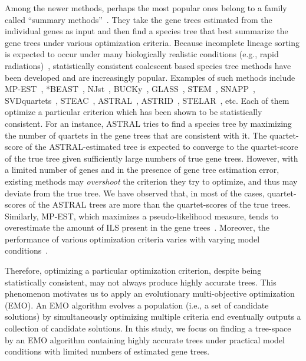 Among the newer methods, perhaps the most popular ones belong to a family called ``summary methods''~\cite{bayzid2013naive}. They take the gene trees estimated from the individual genes as input and then find a species tree that best summarize the gene trees under various optimization criteria. 
Because incomplete lineage sorting is
expected to occur under many biologically realistic conditions (e.g., rapid radiations)~\cite{jarvis2014whole}, statistically consistent coalescent based species tree methods have been developed and are increasingly popular. 
Examples of such methods include
MP-EST~\cite{mpest}, *BEAST~\cite{heled-drummond}, NJst~\cite{njst}, BUCKy~\cite{larget-bioinf2010}, GLASS~\cite{glass}, STEM~\cite{stem}, SNAPP~\cite{snapp}, SVDquartets~\cite{svdquartet}, STEAC~\cite{steac},
ASTRAL~\cite{mirarab2014astral}, ASTRID~\cite{vachaspati2015astrid}, STELAR~\cite{islam2019stelar}, etc. Each of them optimize a particular criterion which has been shown to be statistically consistent. For an instance, ASTRAL tries to find a species tree by maximizing the number of quartets in the gene trees that are consistent with it. The quartet-score of the ASTRAL-estimated tree is expected to converge to the quartet-score of the true tree given sufficiently large numbers of true gene trees. However, with a limited number of genes and in the presence of gene tree estimation error, existing methods may \textit{overshoot} the criterion they try to optimize, and thus may deviate from the true tree. We have observed that, in most of the cases, quartet-scores of the ASTRAL trees are more than the quartet-scores of the true trees. Similarly, MP-EST, which maximizes a pseudo-likelihood measure, tends to overestimate the amount of ILS present in the gene trees~\cite{statistical-binning,bayzid2015weighted}. Moreover, the performance of various optimization criteria varies with varying model conditions~\cite{mirarab2014evaluating,chou2015comparative}.


Therefore, optimizing a particular optimization criterion, despite being statistically consistent, may not always produce highly accurate trees. This phenomenon motivates us to apply an evolutionary multi-objective optimization (EMO). An EMO algorithm evolves a population (i.e., a set of candidate solutions) by simultaneously optimizing multiple criteria end eventually outputs a collection of candidate solutions. 
In this study, we focus on finding a tree-space by an EMO algorithm containing highly accurate trees under practical model conditions with limited numbers of estimated gene trees. 


